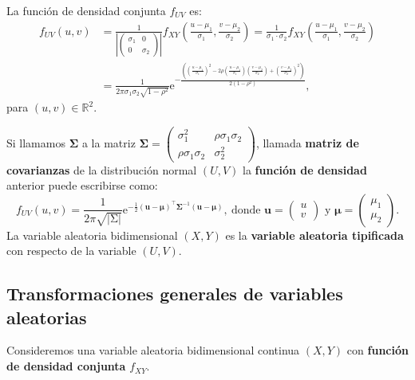 \documentclass[]{book}
\begin{document}
La función de densidad conjunta \(f_{UV}\) es:
\[
\begin{array}{rl}
f_{UV}(u,v) & = \frac{1}{\left|\begin{pmatrix}\sigma_1 & 0\\ 0& \sigma_2\end{pmatrix}\right|} f_{XY}\left(\frac{u-\mu_1}{\sigma_1},\frac{v-\mu_2}{\sigma_2}\right)
=\frac{1}{\sigma_1\cdot \sigma_2}f_{XY}\left(\frac{u-\mu_1}{\sigma_1},\frac{v-\mu_2}{\sigma_2}\right)\\ & =
\frac{1}{2\pi\sigma_1\sigma_2\sqrt{1-\rho^2}}\mathrm{e}^{-\frac{\left(\left(\frac{u-\mu_1}{\sigma_1}\right)^2-2\rho \left(\frac{u-\mu_1}{\sigma_1}\right)\left(\frac{v-\mu_2}{\sigma_2}\right)+\left(\frac{v-\mu_2}{\sigma_2}\right)^2\right)}{2(1-\rho^2)}},
\end{array}
\]
para \((u,v)\in\mathbb{R}^2\).

Si llamamos \(\mathbf{\Sigma}\) a la matriz \(\mathbf{\Sigma}=\begin{pmatrix}\sigma_1^2 & \rho\sigma_1\sigma_2\\ \rho\sigma_1\sigma_2 & \sigma_2^2\end{pmatrix}\), llamada \textbf{matriz de covarianzas} de la distribución normal \((U,V)\) la \textbf{función de densidad} anterior puede escribirse como:
\[
f_{UV}(u,v)=\frac{1}{2\pi \sqrt{\left|\mathrm{\Sigma}\right|}}\mathrm{e}^{-\frac{1}{2}(\mathbf{u}-\mathbf{\mu})^\top \mathbf{\Sigma}^{-1}(\mathbf{u}-\mathbf{\mu})},\ \mbox{donde $\mathbf{u}=\begin{pmatrix}u \\ v\end{pmatrix}$ y $\mathbf{\mu}=\begin{pmatrix}\mu_1\\\mu_2\end{pmatrix}$.}
\]
La variable aleatoria bidimensional \((X,Y)\) es la \textbf{variable aleatoria tipificada} con respecto de la variable \((U,V)\).

\hypertarget{transformaciones-generales-de-variables-aleatorias}{%
\subsection{Transformaciones generales de variables aleatorias}\label{transformaciones-generales-de-variables-aleatorias}}

Consideremos una variable aleatoria bidimensional continua \((X,Y)\) con \textbf{función de densidad conjunta} \(f_{XY}\).
\end{document}
